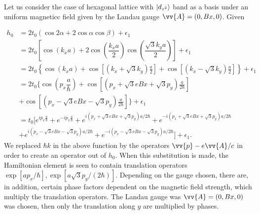 \documentclass{report}
\newcommand{\f}[2]{\dfrac{#1}{#2}}
\begin{document}
Let us consider the case of hexagonal lattice with $\ket{d_{z^{2}}}$ band as a basis under an uniform magneticc field given by the Landau gauge $\vv{A} = (0, Bx,0)$. Given

\begin{equation}
	\begin{aligned}
		h_0
		 & = 2 t_0 \left(\cos2\alpha + 2\cos\alpha \cos\beta\right) + \epsilon_1                                                                                                                         \\
		 & = 2t_{0} \left[ \cos(k_x a) + 2 \cos \left(\f{k_x a}{2}\right) \cos \left(\f{\sqrt{3}k_y a}{2}\right) \right] + \epsilon_1                                                                    \\
		 & = 2t_{0} \left\{ \cos(k_x a) + \cos\left[\left( k_{x} + \sqrt{3} k_{y} \right)\frac{a}{2}\right] + \cos\left[\left( k_{x} - \sqrt{3} k_{y} \right)\frac{a}{2}\right]\right\} + \epsilon_1     \\
		 & = 2t_{0} \Biggl\{ \cos(p_{x}\f{a}{\hbar}) + \cos \left[\left(p_{x} + \sqrt{3} e B x + \sqrt{3} p_{y}\right)\frac{a}{2\hbar}\right]                                                            \\
		 & + \cos \left[\left(p_{x} - \sqrt{3} e B x - \sqrt{3} p_{y}\right)\frac{a}{2\hbar}\right] \Biggr\} + \epsilon_1                                                                                \\
		 & = t_{0} \biggl[e^{i p_{x}\frac{a}{\hbar}} + e^{-ip_{x}\frac{a}{\hbar}} + e^{i(p_{x} + \sqrt{3} eBx + \sqrt{3} p_{y} ) a / 2\hbar} + e^{-i(p_{x} + \sqrt{3} eBx + \sqrt{3} p_{y} ) a / 2\hbar} \\
		 & + e^{i(p_{x} - \sqrt{3} eBx - \sqrt{3} p_{y} ) a / 2\hbar} + e^{-i(p_{x} - \sqrt{3} eBx - \sqrt{3} p_{y} ) a / 2\hbar} \biggr] + \epsilon_1.
	\end{aligned}
\end{equation}
We replaced $\hbar k$ in the above function by the operators $\vv{p} - e \vv{A} / c$ in order to create an operator out of $h_{0}$. When this substitution is made, the Hamiltonian element is seen to contain translation operators $\exp[a p_{x} / \hbar],\exp[a \sqrt{3} p_{y} / (2\hbar)]$. Depending on the gauge chosen, there are, in addition, certain phase factors dependent on the magnetic field strength, which multiply the translation operators. The Landau gauge was $\vv{A} = (0,Bx,0)$ was chosen, then only the translation along $y$ are multiplied by phases. \cite{PhysRevB.14.2239}
\end{document}
